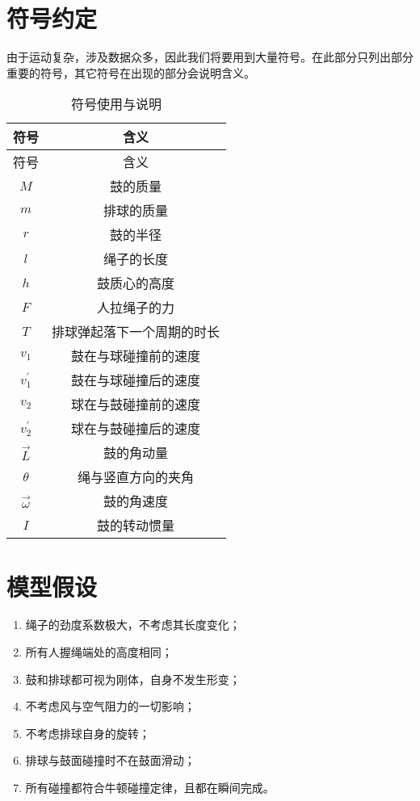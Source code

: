 \documentclass[withoutpreface,bwprint]{cumcmthesis} %
\begin{document}
\section{符号约定}
由于运动复杂，涉及数据众多，因此我们将要用到大量符号。在此部分只列出部分重要的符号，其它符号在出现的部分会说明含义。
\begin{longtable}[c]{cc}
    \caption{符号使用与说明}\label{tab:001}\\
        \toprule[1.5pt] 符号 & 含义\\ \hline \hline \endfirsthead %
        \toprule[1.5pt]  符号 & 含义\\ \hline  \hline \endhead %
        $M$ & 鼓的质量\\
        \hline
        $m$ & 排球的质量\\
        \hline
        $r$ & 鼓的半径\\
        \hline
        $l$ & 绳子的长度\\
        \hline
        $h$ & 鼓质心的高度\\
        \hline
        ${F}$ & 人拉绳子的力\\
        \hline
        $T$ & 排球弹起落下一个周期的时长\\
        \hline
        $v_1$ & 鼓在与球碰撞前的速度\\
        \hline
        $v_1^{'}$ & 鼓在与球碰撞后的速度\\
        \hline
        $v_2$ & 球在与鼓碰撞前的速度\\
        \hline
        $v_2^{'}$ & 球在与鼓碰撞后的速度\\
        \hline
        $\overrightarrow{L}$ & 鼓的角动量\\
        \hline
        $\theta$ & 绳与竖直方向的夹角\\
        \hline
        $\overrightarrow{\omega}$ & 鼓的角速度\\
        \hline
        $I$ & 鼓的转动惯量\\
        \bottomrule[1.5pt]
\end{longtable}

\section{模型假设}

\begin{enumerate}
	\item 绳子的劲度系数极大，不考虑其长度变化；
	\item 所有人握绳端处的高度相同；
	\item 鼓和排球都可视为刚体，自身不发生形变；
	\item 不考虑风与空气阻力的一切影响；
	\item 不考虑排球自身的旋转；
	\item 排球与鼓面碰撞时不在鼓面滑动；
	\item 所有碰撞都符合牛顿碰撞定律，且都在瞬间完成。
\end{enumerate}
\end{document}
